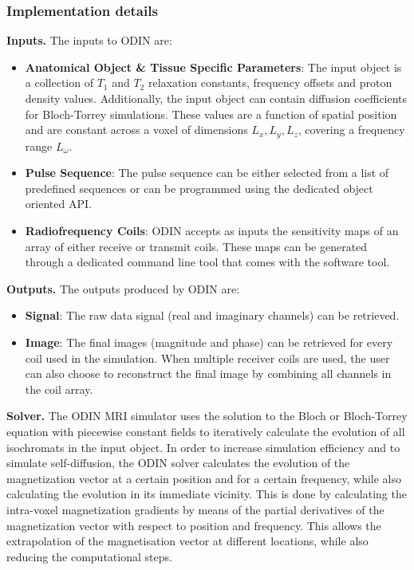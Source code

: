 \hfill

\subsubsection{Implementation details}

\textbf{Inputs.} The inputs to ODIN are:

\begin{itemize}
    
    \item \textbf{Anatomical Object \& Tissue Specific Parameters}: 
    The input object is a collection of $T_1$ and $T_2$ relaxation constants, frequency offsets and proton density values.
    Additionally, the input object can contain diffusion coefficients for Bloch-Torrey simulations.
    These values are a function of spatial position and are constant across a voxel of dimensions $L_x, L_y, L_z$, covering a frequency range $L_{\omega}$.
    
    \item \textbf{Pulse Sequence}: The pulse sequence can be either selected from a list of predefined sequences or can be programmed using the dedicated object oriented API.
    
    \item \textbf{Radiofrequency Coils}: ODIN accepts as inputs the sensitivity maps of an array of either receive or transmit coils.
    These maps can be generated through a dedicated command line tool that comes with the software tool.
    
\end{itemize}


\hfill

\textbf{Outputs.} The outputs produced by ODIN are:
\begin{itemize}
    
    \item \textbf{Signal}: The raw data signal (real and imaginary channels) can be retrieved.
    
    \item \textbf{Image}: The final images (magnitude and phase) can be retrieved for every coil used in the simulation.
    When multiple receiver coils are used, the user can also choose to reconstruct the final image by combining all channels in the coil array.
    
\end{itemize}

\hfill

\textbf{Solver.} The ODIN MRI simulator uses the solution 
to the Bloch or Bloch-Torrey equation with piecewise constant fields to iteratively calculate the evolution of all isochromats in the input object.
In order to increase simulation efficiency and to simulate self-diffusion, the ODIN solver calculates the evolution of the magnetization vector at a certain position and for a certain frequency, while also calculating the evolution in its immediate vicinity.
This is done by calculating the intra-voxel magnetization gradients by means of the partial derivatives of the magnetization vector with respect to position and frequency.
This allows the extrapolation of the magnetisation vector at different locations, while also reducing the computational steps.

